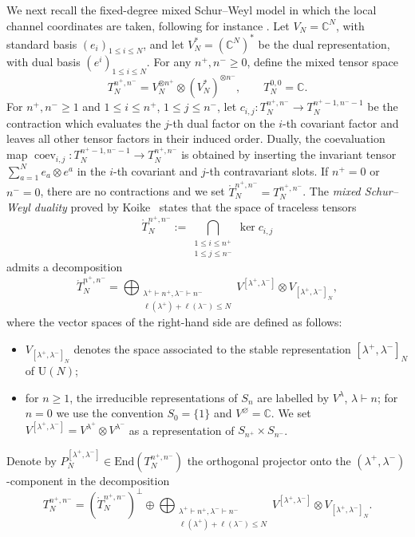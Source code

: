 \documentclass[11pt,a4paper,reqno]{amsart}
\theoremstyle{definition}
\theoremstyle{remark}
\newcommand\U{{\mathrm U}}
\newcommand\C{{\mathbb C}}
\newcommand\End{{\mathrm{End}}}
\begin{document}
We next recall the fixed-degree mixed Schur--Weyl model in which the local channel coordinates are taken, following for instance \cite{Dah26,Lem26a}. Let $V_N=\C^N$, with standard basis $(e_i)_{1\le i\le N}$, and let $V_N^*=(\C^N)^*$ be the dual representation, with dual basis $(e^i)_{1\le i\le N}$.  For any $n^+,n^-\ge0$, define the mixed tensor space
\[
T_N^{n^+,n^-}=V_N^{\otimes n^+}\otimes (V_N^*)^{\otimes n^-},
\qquad
T_N^{0,0}=\C.
\]
For $n^+,n^-\ge1$ and $1\le i\le n^+$, $1\le j\le n^-$, let $c_{i,j}:T_N^{n^+,n^-}\longrightarrow T_N^{n^+-1,n^--1}$ be the contraction which evaluates the $j$-th dual factor on the $i$-th covariant factor and leaves all other tensor factors in their induced order.  Dually, the coevaluation map $\operatorname{coev}_{i,j}:T_N^{n^+-1,n^--1}\longrightarrow T_N^{n^+,n^-}$ is obtained by inserting the invariant tensor $\sum_{a=1}^N e_a\otimes e^a$ in the $i$-th covariant and $j$-th contravariant slots.  If $n^+=0$ or $n^-=0$, there are no contractions and we set $\mathring T_N^{n^+,n^-}=T_N^{n^+,n^-}$. The \emph{mixed Schur--Weyl duality} proved by Koike~\cite{Koi89} states that the space of traceless tensors
\[
\mathring{T}_N^{n^+,n^-}:=\bigcap_{\substack{1\leq i\leq n^+\\ 1\leq j\leq n^-}}\ker c_{i,j}
\]
admits a decomposition
\begin{equation}\label{eq:Koike}
\mathring{T}_N^{n^+,n^-}=\bigoplus_{\substack{\lambda^+\vdash n^+,\lambda^-\vdash n^-\\ \ell(\lambda^+)+\ell(\lambda^-)\leq N}}V^{[\lambda^+,\lambda^-]}\otimes V_{[\lambda^+,\lambda^-]_N},
\end{equation}
where the vector spaces of the right-hand side are defined as follows:
\begin{itemize}
\item $V_{[\lambda^+,\lambda^-]_N}$ denotes the space associated to the stable representation $[\lambda^+,\lambda^-]_N$ of $\U(N)$;
\item for $n\ge1$, the irreducible representations of $S_n$ are labelled by $V^\lambda$, $\lambda\vdash n$; for $n=0$ we use the convention $S_0=\{1\}$ and $V^\varnothing=\C$.  We set $V^{[\lambda^+,\lambda^-]}=V^{\lambda^+}\otimes V^{\lambda^-}$ as a representation of $S_{n^+}\times S_{n^-}$.
\end{itemize}
Denote by $P_N^{[\lambda^+,\lambda^-]}\in\End(T_N^{n^+,n^-})$ the orthogonal projector onto the $(\lambda^+,\lambda^-)$-component in the decomposition
\begin{equation}\label{eq:Koike2}
T_N^{n^+,n^-}=(\mathring{T}_N^{n^+,n^-})^\perp\oplus\bigoplus_{\substack{\lambda^+\vdash n^+,\lambda^-\vdash n^-\\ \ell(\lambda^+)+\ell(\lambda^-)\leq N}}V^{[\lambda^+,\lambda^-]}\otimes V_{[\lambda^+,\lambda^-]_N}.
\end{equation}
\end{document}
